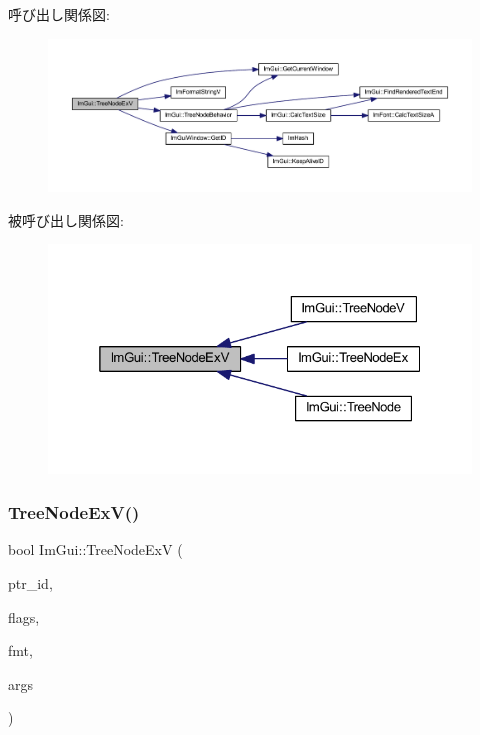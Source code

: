 呼び出し関係図\+:\nopagebreak
\begin{figure}[H]
\begin{center}
\leavevmode
\includegraphics[width=350pt]{namespace_im_gui_a251cd4acbdad4cef2246d9b573a83ce0_cgraph}
\end{center}
\end{figure}
被呼び出し関係図\+:\nopagebreak
\begin{figure}[H]
\begin{center}
\leavevmode
\includegraphics[width=325pt]{namespace_im_gui_a251cd4acbdad4cef2246d9b573a83ce0_icgraph}
\end{center}
\end{figure}
\mbox{\label{namespace_im_gui_aaae827898572d17e064a88a1afc8e6b0}} 
\subsubsection{\texorpdfstring{Tree\+Node\+Ex\+V()}{TreeNodeExV()}\hspace{0.1cm}{\footnotesize\ttfamily [2/2]}}
{\footnotesize\ttfamily bool Im\+Gui\+::\+Tree\+Node\+ExV (\begin{DoxyParamCaption}\item[{const void $\ast$}]{ptr\+\_\+id,  }\item[{\mbox{\hyperlink{imgui_8h_a0588fdd10c59b49a0159484fe9ec4564}{Im\+Gui\+Tree\+Node\+Flags}}}]{flags,  }\item[{const char $\ast$}]{fmt,  }\item[{va\+\_\+list}]{args }\end{DoxyParamCaption})}



